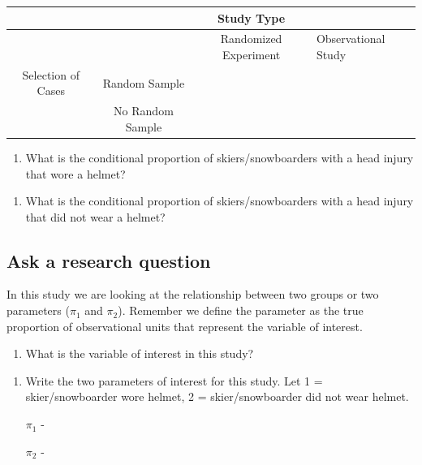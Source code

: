 \documentclass[
]{report}
\providecommand{\tightlist}{%
  \setlength{\itemsep}{0pt}\setlength{\parskip}{0pt}}
\begin{document}
\begin{longtable}[]{@{}cccl@{}}
\toprule
& & Study Type &\tabularnewline
\midrule
\endhead
& & Randomized Experiment & Observational Study\tabularnewline
Selection of Cases & Random Sample & &\tabularnewline
& No Random Sample & &\tabularnewline
\bottomrule
\end{longtable}

\begin{enumerate}
\def\labelenumi{\arabic{enumi}.}
\setcounter{enumi}{4}
\tightlist
\item
  What is the conditional proportion of skiers/snowboarders with a head injury that wore a helmet?
\end{enumerate}

\vspace{.6in}

\begin{enumerate}
\def\labelenumi{\arabic{enumi}.}
\setcounter{enumi}{5}
\tightlist
\item
  What is the conditional proportion of skiers/snowboarders with a head injury that did not wear a helmet?
\end{enumerate}

\vspace{.6in}

\hypertarget{ask-a-research-question}{%
\subsection{Ask a research question}\label{ask-a-research-question}}

In this study we are looking at the relationship between two groups or two parameters (\(\pi_1\) and \(\pi_2\)). Remember we define the parameter as the true proportion of observational units that represent the variable of interest.

\begin{enumerate}
\def\labelenumi{\arabic{enumi}.}
\setcounter{enumi}{6}
\tightlist
\item
  What is the variable of interest in this study?
\end{enumerate}

\vspace{0.5in}

\begin{enumerate}
\def\labelenumi{\arabic{enumi}.}
\setcounter{enumi}{7}
\item
  Write the two parameters of interest for this study. Let 1 = skier/snowboarder wore helmet, 2 = skier/snowboarder did not wear helmet.

  \(\pi_1\) -
  \vspace{0.5in}

  \(\pi_2\) -
  \vspace{0.5in}
\end{enumerate}
\end{document}
